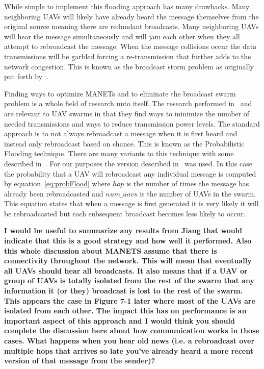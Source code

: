 While simple to implement this flooding approach has many drawbacks.  Many neighboring UAVs will likely have already heard the message themselves from the original source meaning there are redundant broadcasts.  Many neighboring UAVs will hear the message simultaneously and will jam each other when they all attempt to rebroadcast the message.  When the message collisions occur the data transmissions will be garbled forcing a re-transmission that further adds to the network congestion.  This is known as the broadcast storm problem as originally put forth by~\cite{bstorm}.

Finding ways to optimize MANETs and to eliminate the broadcast swarm problem is a whole field of research unto itself.  The research performed in~\cite{epidemicManets} and ~\cite{analysisOptNodeDen} are relevant to UAV swarms in that they find ways to minimize the number of needed transmissions and ways to reduce transmission power levels.  The standard approach is to not always rebroadcast a message when it is first heard and instead only rebroadcast based on chance.  This is known as the Probabilistic Flooding technique.  There are many variants to this technique with some described in~\cite{probFloodVariants}.  For our purposes the version described in~\cite{simpleProbFlood} was used.  In this case the probability that a UAV will rebroadcast any individual message is computed by equation~\ref{eq:probFlood} where $hop$ is the number of times the message has already been rebroadcasted and $num\_uavs$ is the number of UAVs in the swarm.  This equation states that when a message is first generated it is very likely it will be rebroadcasted but each subsequent broadcast becomes less likely to occur.

\textbf{I would be useful to summarize any results from Jiang that would indicate that this is a good strategy and how well it performed. Also this whole discussion about MANETS assume that there is connectivity throughout the network. This will mean that eventually all UAVs should hear all broadcasts. It also means that if a UAV or group of UAVs is totally isolated from the rest of the swarm that any information it (or they) broadcast is lost to the rest of the swarm. This appears the case in Figure 7-1 later where most of the UAVs are isolated from each other. The impact this has on performance is an important aspect of this approach and I would think you should complete the discussion here about how communication works in those cases.	What happens when you hear old news (i.e. a rebroadcast over multiple hops that arrives so late you’ve already heard a more recent version of that message from the sender)?}

